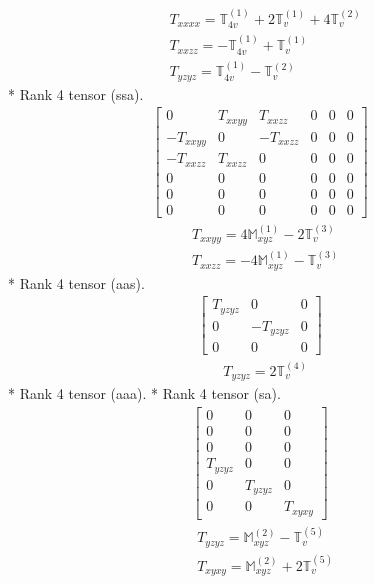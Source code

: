 \documentclass[fleqn,8pt,landscape]{jsarticle}
\begin{document}
\begin{align*}
& T_{xxxx} = \mathbb{T}_{4v}^{(1)} + 2 \mathbb{T}_{v}^{(1)} + 4 \mathbb{T}_{v}^{(2)} \\
& T_{xxzz} = - \mathbb{T}_{4v}^{(1)} + \mathbb{T}_{v}^{(1)} \\
& T_{yzyz} = \mathbb{T}_{4v}^{(1)} - \mathbb{T}_{v}^{(2)}
\end{align*}
* Rank 4 tensor (ssa).
\begin{align*}
\begin{bmatrix} 0 & T_{xxyy} & T_{xxzz} & 0 & 0 & 0 \\ - T_{xxyy} & 0 & - T_{xxzz} & 0 & 0 & 0 \\ - T_{xxzz} & T_{xxzz} & 0 & 0 & 0 & 0 \\ 0 & 0 & 0 & 0 & 0 & 0 \\ 0 & 0 & 0 & 0 & 0 & 0 \\ 0 & 0 & 0 & 0 & 0 & 0 \end{bmatrix}
\end{align*}
\begin{align*}
& T_{xxyy} = 4 \mathbb{M}_{xyz}^{(1)} - 2 \mathbb{T}_{v}^{(3)} \\
& T_{xxzz} = - 4 \mathbb{M}_{xyz}^{(1)} - \mathbb{T}_{v}^{(3)}
\end{align*}
* Rank 4 tensor (aas).
\begin{align*}
\begin{bmatrix} T_{yzyz} & 0 & 0 \\ 0 & - T_{yzyz} & 0 \\ 0 & 0 & 0 \end{bmatrix}
\end{align*}
\begin{align*}
& T_{yzyz} = 2 \mathbb{T}_{v}^{(4)}
\end{align*}
* Rank 4 tensor (aaa).
* Rank 4 tensor (sa).
\begin{align*}
\begin{bmatrix} 0 & 0 & 0 \\ 0 & 0 & 0 \\ 0 & 0 & 0 \\ T_{yzyz} & 0 & 0 \\ 0 & T_{yzyz} & 0 \\ 0 & 0 & T_{xyxy} \end{bmatrix}
\end{align*}
\begin{align*}
& T_{yzyz} = \mathbb{M}_{xyz}^{(2)} - \mathbb{T}_{v}^{(5)} \\
& T_{xyxy} = \mathbb{M}_{xyz}^{(2)} + 2 \mathbb{T}_{v}^{(5)}
\end{align*}
\end{document}
